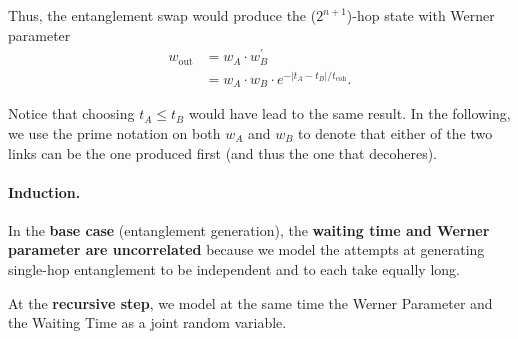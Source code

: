 \documentclass{masterthesis}
\begin{document}
Thus, the entanglement swap would produce the ($2^{n+1}$)-hop state with Werner parameter
\begin{align}
    w_\text{out} &= w_{A} \cdot w_{B}^{\prime} \nonumber \\
                 &= w_{A} \cdot w_{B} \cdot e^{-\left|t_{A}-t_{B}\right| / t_\text{coh}} .
\end{align}

Notice that choosing $t_{A} \leq t_{B}$ would have lead to the same result.
In the following, we use the prime notation on both $w_A$ and $w_B$ to denote that either of the two links can be the one produced first (and thus the one that decoheres).

\paragraph*{Induction.}

In the \textbf{base case} (entanglement generation), the \textbf{waiting time and Werner parameter are uncorrelated} because we model the attempts at generating single-hop entanglement to be independent and to each take equally long.

At the \textbf{recursive step}, we model at the same time the Werner Parameter and the Waiting Time as a joint random variable. %



\end{document}

